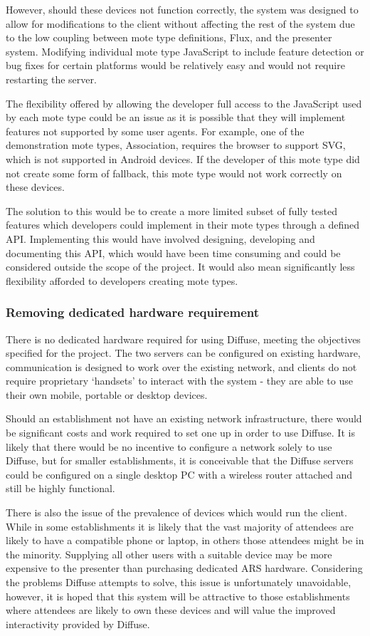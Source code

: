 \documentclass[a4papert,11pt,notitlepage]{ltxdoc}
\begin{document}
However, should these devices not function correctly, the system was designed to allow for modifications to the client without affecting the rest of the system due to the low coupling between mote type definitions, Flux, and the presenter system. Modifying individual mote type JavaScript to include feature detection or bug fixes for certain platforms would be relatively easy and would not require restarting the server.

The flexibility offered by allowing the developer full access to the JavaScript used by each mote type could be an issue as it is possible that they will implement features not supported by some user agents. For example, one of the demonstration mote types, Association, requires the browser to support SVG, which is not supported in Android devices. If the developer of this mote type did not create some form of fallback, this mote type would not work correctly on these devices. 

The solution to this would be to create a more limited subset of fully tested features which developers could implement in their mote types through a defined API. Implementing this would have involved designing, developing and documenting this API, which would have been time consuming and could be considered outside the scope of the project. It would also mean significantly less flexibility afforded to developers creating mote types.

\subsubsection{Removing dedicated hardware requirement}
There is no dedicated hardware required for using Diffuse, meeting the objectives specified for the project. The two servers can be configured on existing hardware, communication is designed to work over the existing network, and clients do not require proprietary `handsets' to interact with the system - they are able to use their own mobile, portable or desktop devices.

Should an establishment not have an existing network infrastructure, there would be significant costs and work required to set one up in order to use Diffuse. It is likely that there would be no incentive to configure a network solely to use Diffuse, but for smaller establishments, it is conceivable that the Diffuse servers could be configured on a single desktop PC with a wireless router attached and still be highly functional.

There is also the issue of the prevalence of devices which would run the client. While in some establishments it is likely that the vast majority of attendees are likely to have a compatible phone or laptop, in others those attendees might be in the minority. Supplying all other users with a suitable device may be more expensive to the presenter than purchasing dedicated ARS hardware. Considering the problems Diffuse attempts to solve, this issue is unfortunately unavoidable, however, it is hoped that this system will be attractive to those establishments where attendees are likely to own these devices and will value the improved interactivity provided by Diffuse.
\end{document}
